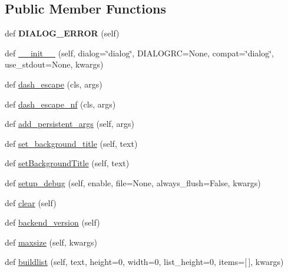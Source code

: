 \subsection*{Public Member Functions}
\begin{DoxyCompactItemize}
\item 
def {\bfseries D\+I\+A\+L\+O\+G\+\_\+\+E\+R\+R\+OR} (self)\hypertarget{class_libraries_1_1dialog_1_1_dialog_a3f2280385cd186116133f138cda5dbd3}{}\label{class_libraries_1_1dialog_1_1_dialog_a3f2280385cd186116133f138cda5dbd3}

\item 
def \hyperlink{class_libraries_1_1dialog_1_1_dialog_a780a16d763256f7f2c55757ba0b9eb84}{\+\_\+\+\_\+init\+\_\+\+\_\+} (self, dialog=\char`\"{}dialog\char`\"{}, D\+I\+A\+L\+O\+G\+RC=None, compat=\char`\"{}dialog\char`\"{}, use\+\_\+stdout=None, kwargs)
\item 
def \hyperlink{class_libraries_1_1dialog_1_1_dialog_aa320083d4bf34c8c602f8b1fed3b970e}{dash\+\_\+escape} (cls, args)
\item 
def \hyperlink{class_libraries_1_1dialog_1_1_dialog_a6cb277d6b8f6492fd3b317450c3736e8}{dash\+\_\+escape\+\_\+nf} (cls, args)
\item 
def \hyperlink{class_libraries_1_1dialog_1_1_dialog_a1662b5ea66407e59668386f034e3b2f3}{add\+\_\+persistent\+\_\+args} (self, args)
\item 
def \hyperlink{class_libraries_1_1dialog_1_1_dialog_a1cc6d193dfcd8d1e856ae24644cf1278}{set\+\_\+background\+\_\+title} (self, text)
\item 
def \hyperlink{class_libraries_1_1dialog_1_1_dialog_a625a6d2f29f125efd90c0d98f63c89f0}{set\+Background\+Title} (self, text)
\item 
def \hyperlink{class_libraries_1_1dialog_1_1_dialog_a155a79ad3d14e528685785f0dbecd0cb}{setup\+\_\+debug} (self, enable, file=None, always\+\_\+flush=False, kwargs)
\item 
def \hyperlink{class_libraries_1_1dialog_1_1_dialog_a0f921998149577ed4058ba52c51fe5f8}{clear} (self)
\item 
def \hyperlink{class_libraries_1_1dialog_1_1_dialog_ad0f28b27f7d4c0d1ab262474b83c6200}{backend\+\_\+version} (self)
\item 
def \hyperlink{class_libraries_1_1dialog_1_1_dialog_a3cda66750ef62feebc600996c0e141fa}{maxsize} (self, kwargs)
\item 
def \hyperlink{class_libraries_1_1dialog_1_1_dialog_a9fd7cc0d6a211d43068fc2c69e21040f}{buildlist} (self, text, height=0, width=0, list\+\_\+height=0, items=\mbox{[}$\,$\mbox{]}, kwargs)

\end{DoxyCompactItemize}
